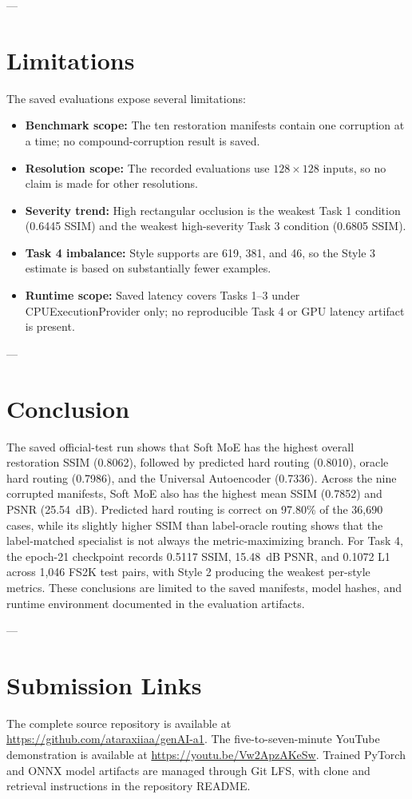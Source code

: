 \documentclass[journal,compsoc]{IEEEtran}
\begin{document}
---

\section{Limitations}
\label{sec:limitations}
The saved evaluations expose several limitations:
\begin{itemize}
    \item \textbf{Benchmark scope:} The ten restoration manifests contain one corruption at a time; no compound-corruption result is saved.
    \item \textbf{Resolution scope:} The recorded evaluations use $128\times128$ inputs, so no claim is made for other resolutions.
    \item \textbf{Severity trend:} High rectangular occlusion is the weakest Task 1 condition (0.6445 SSIM) and the weakest high-severity Task 3 condition (0.6805 SSIM).
    \item \textbf{Task 4 imbalance:} Style supports are 619, 381, and 46, so the Style 3 estimate is based on substantially fewer examples.
    \item \textbf{Runtime scope:} Saved latency covers Tasks 1--3 under CPUExecutionProvider only; no reproducible Task 4 or GPU latency artifact is present.
\end{itemize}

---

\section{Conclusion}
\label{sec:conclusion}
The saved official-test run shows that Soft MoE has the highest overall restoration SSIM (0.8062), followed by predicted hard routing (0.8010), oracle hard routing (0.7986), and the Universal Autoencoder (0.7336). Across the nine corrupted manifests, Soft MoE also has the highest mean SSIM (0.7852) and PSNR (25.54~dB). Predicted hard routing is correct on 97.80\% of the 36,690 cases, while its slightly higher SSIM than label-oracle routing shows that the label-matched specialist is not always the metric-maximizing branch. For Task 4, the epoch-21 checkpoint records 0.5117 SSIM, 15.48~dB PSNR, and 0.1072 L1 across 1,046 FS2K test pairs, with Style 2 producing the weakest per-style metrics. These conclusions are limited to the saved manifests, model hashes, and runtime environment documented in the evaluation artifacts.

---

\section{Submission Links}
\label{sec:submission_links}
The complete source repository is available at
\url{https://github.com/ataraxiiaa/genAI-a1}. The five-to-seven-minute YouTube
demonstration is available at \url{https://youtu.be/Vw2ApzAKeSw}. Trained
PyTorch and ONNX model artifacts are managed through Git LFS, with clone and
retrieval instructions in the repository README.
\end{document}
